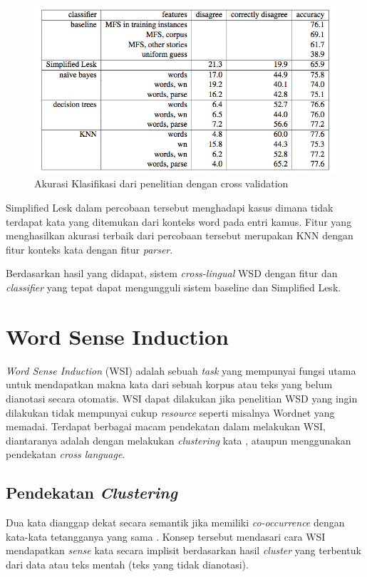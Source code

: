 \begin{figure}
	\centering
	\includegraphics[width=1\linewidth]{adit_pics/crosslanguage-wsd}
	\caption{Akurasi Klasifikasi dari penelitian \citep{rudnick2011towards} dengan cross validation}
	\label{fig:akurasi-klasifikasi}
\end{figure}

Simplified Lesk dalam percobaan tersebut menghadapi kasus dimana tidak terdapat kata yang ditemukan dari konteks word pada entri kamus. Fitur yang menghasilkan akurasi terbaik dari percobaan tersebut merupakan KNN dengan fitur konteks kata dengan fitur \textit{parser}.

Berdasarkan hasil yang didapat, sistem \textit{cross-lingual} WSD dengan fitur dan \textit{classifier} yang tepat dapat mengungguli sistem baseline dan Simplified Lesk.

\section{Word Sense Induction}
\textit{Word Sense Induction} (WSI) adalah sebuah \textit{task} yang mempunyai fungsi utama untuk mendapatkan makna kata dari sebuah korpus atau teks yang belum dianotasi secara otomatis. WSI dapat dilakukan jika penelitian WSD yang ingin dilakukan tidak mempunyai cukup \textit{resource} seperti misalnya Wordnet yang memadai. Terdapat berbagai macam pendekatan dalam melakukan WSI, diantaranya adalah dengan melakukan \textit{clustering} kata \citep{denkowski2009survey}, ataupun menggunakan pendekatan \textit{cross language}.
	
	\subsection{Pendekatan \textit{Clustering}}
	Dua kata dianggap dekat secara semantik jika memiliki \textit{co-occurrence} dengan kata-kata tetangganya yang sama \citep{nasiruddin2013state}. Konsep tersebut mendasari cara WSI mendapatkan \textit{sense} kata secara implisit berdasarkan hasil \textit{cluster} yang terbentuk dari data atau teks mentah (teks yang tidak dianotasi).
	
